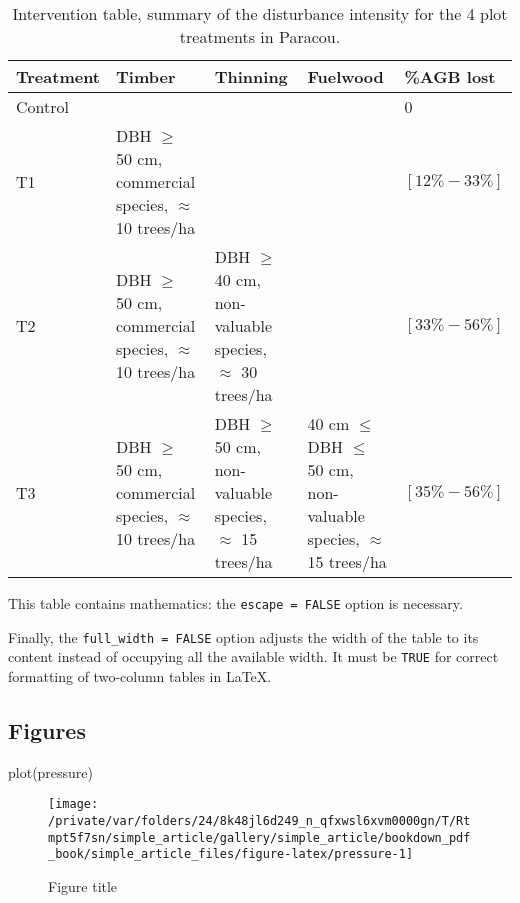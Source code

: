 \documentclass[fleqn,]{article} %
\newenvironment{Shaded}{\begin{snugshade}}{\end{snugshade}}
\newcommand{\FunctionTok}[1]{\textcolor[rgb]{0.00,0.00,0.00}{{#1}}}
\newcommand{\NormalTok}[1]{{#1}}
\begin{document}
\begin{table}

\caption{\label{tab:Paracou}Intervention table, summary of the disturbance intensity for the 4 plot treatments in Paracou.}
\centering
\begin{tabu} to 
\toprule
Treatment & Timber & Thinning & Fuelwood & \%AGB lost\\
\midrule
Control &  &  &  & 0\\
T1 & DBH $\geq$ 50 cm, commercial species, $\approx$ 10 trees/ha &  &  & $[12\%-33\%]$\\
T2 & DBH $\geq$ 50 cm, commercial species, $\approx$ 10 trees/ha & DBH $\geq$ 40 cm, non-valuable species, $\approx$ 30 trees/ha &  & $[33\%-56\%]$\\
T3 & DBH $\geq$ 50 cm, commercial species, $\approx$ 10 trees/ha & DBH $\geq$ 50 cm, non-valuable species, $\approx$ 15 trees/ha & 40 cm $\leq$ DBH $\leq$ 50 cm, non-valuable species, $\approx$ 15 trees/ha & $[35\%-56\%]$\\
\bottomrule
\end{tabu}
\end{table}

\normalsize

This table contains mathematics: the \texttt{escape\ =\ FALSE} option is necessary.

Finally, the \texttt{full\_width\ =\ FALSE} option adjusts the width of the table to its content instead of occupying all the available width.
It must be \texttt{TRUE} for correct formatting of two-column tables in LaTeX.

\hypertarget{figures}{%
\subsection{Figures}\label{figures}}

\scriptsize

\begin{Shaded}
\begin{Highlighting}[]
\FunctionTok{plot}\NormalTok{(pressure)}
\end{Highlighting}
\end{Shaded}

\begin{figure}

{\centering \texttt{[image: /private/var/folders/24/8k48jl6d249\_n\_qfxwsl6xvm0000gn/T/Rtmpt5f7sn/simple\_article/gallery/simple\_article/bookdown\_pdf\_book/simple\_article\_files/figure-latex/pressure-1]} 

}

\caption{Figure title}\label{fig:pressure}
\end{figure}
\end{document}
